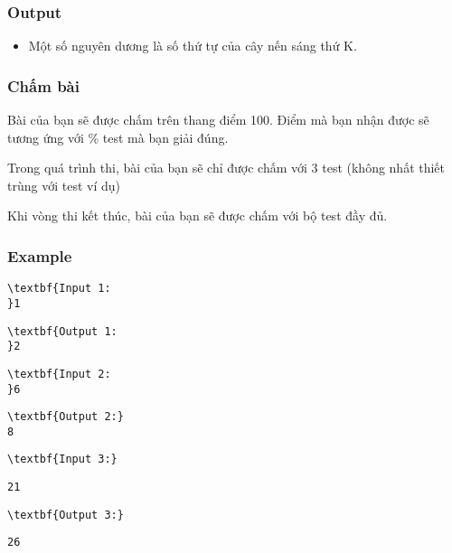 \subsubsection{Output}
\begin{itemize}
	\item Một số nguyên dương là số thứ tự của cây nến sáng thứ K.
\end{itemize}

\subsubsection{Chấm bài}

Bài của bạn sẽ được chấm trên thang điểm 100. Điểm mà bạn nhận được sẽ tương ứng với \% test mà bạn giải đúng.

Trong quá trình thi, bài của bạn sẽ chỉ được chấm với 3 test (không nhất thiết trùng với test ví dụ)

Khi vòng thi kết thúc, bài của bạn sẽ được chấm với bộ test đầy đủ.

\subsubsection{Example}
\begin{verbatim}
\textbf{Input 1:
}1\end{verbatim}
\begin{verbatim}
\textbf{Output 1:
}2
\end{verbatim}
\begin{verbatim}
\textbf{Input 2:
}6 \end{verbatim}
\begin{verbatim}
\textbf{Output 2:}
8
\end{verbatim}
\begin{verbatim}
\textbf{Input 3:}\end{verbatim}
\begin{verbatim}
21 \end{verbatim}
\begin{verbatim}
\textbf{Output 3:}\end{verbatim}
\begin{verbatim}
26
\end{verbatim}